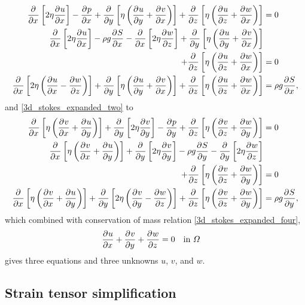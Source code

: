 {\tiny
\begin{align}
  \parder{}{x} \left[2\eta \parder{u}{x} \right]  - \parder{p}{x} + \parder{}{y} \left[\eta \left( \parder{u}{y} + \parder{v}{x} \right) \right] + \parder{}{z} \left[\eta \left( \parder{u}{z} + \parder{w}{x} \right) \right] &= 0 \notag \\ 
  \parder{}{x} \left[2\eta \parder{u}{x} \right]  - \rho g\parder{S}{x} - \parder{}{x} \left[ 2\eta \parder{w}{z} \right] + \parder{}{y} \left[\eta \left( \parder{u}{y} + \parder{v}{x} \right) \right] & \notag \\
  + \parder{}{z} \left[\eta \left( \parder{u}{z} + \parder{w}{x} \right) \right] &= 0 \notag \\ 
  \label{first_stokes_exp_stress_simp}
  \parder{}{x} \left[2\eta \left( \parder{u}{x} - \parder{w}{z} \right) \right]  + \parder{}{y} \left[\eta \left( \parder{u}{y} + \parder{v}{x} \right) \right] + \parder{}{z} \left[\eta \left( \parder{u}{z} + \parder{w}{x} \right) \right] &= \rho g\parder{S}{x},
\end{align}}
and \cref{3d_stokes_expanded_two} to
{\tiny
\begin{align}
  \parder{}{x} \left[\eta \left( \parder{v}{x} + \parder{u}{y} \right) \right]  + \parder{}{y} \left[2\eta \parder{v}{y} \right] - \parder{p}{y} + \parder{}{z} \left[\eta \left( \parder{v}{z} + \parder{w}{y} \right) \right] &= 0 \notag \\ 
  \parder{}{x} \left[\eta \left( \parder{v}{x} + \parder{u}{y} \right) \right]  + \parder{}{y} \left[2\eta \parder{v}{y} \right] - \rho g\parder{S}{y} - \parder{}{y} \left[ 2\eta \parder{w}{z} \right] &\notag \\
  + \parder{}{z} \left[\eta \left( \parder{v}{z} + \parder{w}{y} \right) \right] &= 0 \notag \\ 
  \label{second_stokes_exp_stress_simp}
  \parder{}{x} \left[\eta \left( \parder{v}{x} + \parder{u}{y} \right) \right]  + \parder{}{y} \left[2\eta \left( \parder{v}{y} - \parder{w}{z} \right) \right] + \parder{}{z} \left[\eta \left( \parder{v}{z} + \parder{w}{y} \right) \right] &= \rho g \parder{S}{y},
\end{align}}
which combined with conservation of mass relation \cref{3d_stokes_expanded_four},
\begin{align*}
  \frac{\partial{^{}} u}{\partial x{^{}} } + \frac{\partial{^{}} v}{\partial y{^{}} } + \frac{\partial{^{}} w}{\partial z{^{}} } &= 0 && \text{in } \varOmega 
\end{align*}
gives three equations and three unknowns $u$, $v$, and $w$.

\subsection{Strain tensor simplification} \label{ssn_strain_tensor_simplification}

